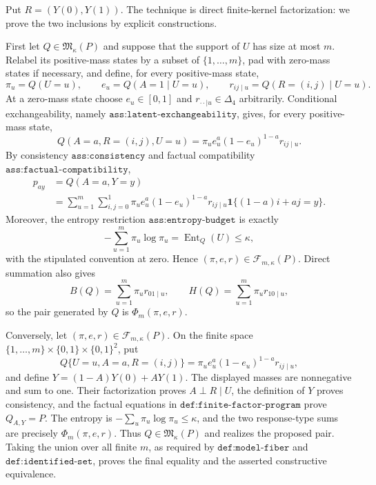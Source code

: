 Put \(R=(Y(0),Y(1))\).  The technique is direct finite-kernel factorization: we prove the two inclusions by explicit constructions.

First let \(Q\in\mathfrak M_\kappa(P)\) and suppose that the support of \(U\) has size at most \(m\).  Relabel its positive-mass states by a subset of \(\{1,\ldots,m\}\), pad with zero-mass states if necessary, and define, for every positive-mass state,
\[
 \pi_u=Q(U=u),\qquad e_u=Q(A=1\mid U=u),\qquad
 r_{ij\mid u}=Q(R=(i,j)\mid U=u).
\]
At a zero-mass state choose \(e_u\in[0,1]\) and \(r_{\cdot\cdot\mid u}\in\Delta_4\) arbitrarily.  Conditional exchangeability, namely \(\texttt{ass:latent-exchangeability}\), gives, for every positive-mass state,
\[
 Q(A=a,R=(i,j),U=u)
 =\pi_u e_u^a(1-e_u)^{1-a}r_{ij\mid u}.
\]
By consistency \(\texttt{ass:consistency}\) and factual compatibility \(\texttt{ass:factual-compatibility}\),
\[
 \begin{aligned}
 p_{ay}
 &=Q(A=a,Y=y)\\
 &=\sum_{u=1}^m\sum_{i,j=0}^1
 \pi_u e_u^a(1-e_u)^{1-a}r_{ij\mid u}
 \mathbf 1\{(1-a)i+aj=y\}.
 \end{aligned}
\]
Moreover, the entropy restriction \(\texttt{ass:entropy-budget}\) is exactly
\[
 -\sum_{u=1}^m\pi_u\log\pi_u=\operatorname{Ent}_Q(U)\leq\kappa,
\]
with the stipulated convention at zero.  Hence \((\pi,e,r)\in\mathcal F_{m,\kappa}(P)\).  Direct summation also gives
\[
 B(Q)=\sum_{u=1}^m\pi_u r_{01\mid u},\qquad
 H(Q)=\sum_{u=1}^m\pi_u r_{10\mid u},
\]
so the pair generated by \(Q\) is \(\Phi_m(\pi,e,r)\).

Conversely, let \((\pi,e,r)\in\mathcal F_{m,\kappa}(P)\).  On the finite space \(\{1,\ldots,m\}\times\{0,1\}\times\{0,1\}^2\), put
\[
 Q\{U=u,A=a,R=(i,j)\}
 =\pi_u e_u^a(1-e_u)^{1-a}r_{ij\mid u},
\]
and define \(Y=(1-A)Y(0)+AY(1)\).  The displayed masses are nonnegative and sum to one.  Their factorization proves \(A\perp R\mid U\), the definition of \(Y\) proves consistency, and the factual equations in \(\texttt{def:finite-factor-program}\) prove \(Q_{A,Y}=P\).  The entropy is \(-\sum_u\pi_u\log\pi_u\leq\kappa\), and the two response-type sums are precisely \(\Phi_m(\pi,e,r)\).  Thus \(Q\in\mathfrak M_\kappa(P)\) and realizes the proposed pair.  Taking the union over all finite \(m\), as required by \(\texttt{def:model-fiber}\) and \(\texttt{def:identified-set}\), proves the final equality and the asserted constructive equivalence.